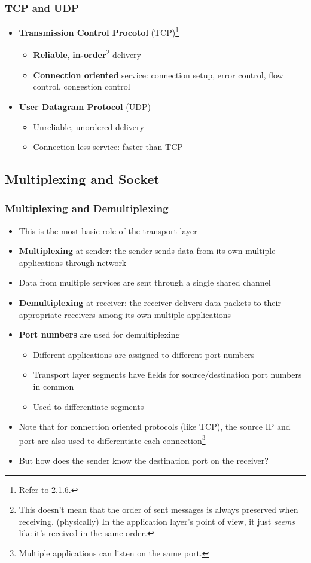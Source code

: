 \subsubsection{TCP and UDP}
\begin{itemize}
	\item \textbf{Transmission Control Procotol} (TCP)\footnote{Refer to 2.1.6.}
	\begin{itemize}
		\item \textbf{Reliable}, \textbf{in-order}\footnote{This doesn't mean that the order of sent messages is always preserved when receiving. (physically) In the application layer's point of view, it just \textit{seems} like it's received in the same order.} delivery
		\item \textbf{Connection oriented} service: connection setup, error control, flow control, congestion control
	\end{itemize}
	\item \textbf{User Datagram Protocol} (UDP)
	\begin{itemize}
		\item Unreliable, unordered delivery
		\item Connection-less service: faster than TCP
	\end{itemize}
\end{itemize}

\subsection{Multiplexing and Socket}
\subsubsection{Multiplexing and Demultiplexing}
\begin{itemize}
	\item This is the most basic role of the transport layer
	\item \textbf{Multiplexing} at sender: the sender sends data from its own multiple applications through network
	\item Data from multiple services are sent through a single shared channel
	\item \textbf{Demultiplexing} at receiver: the receiver delivers data packets to their appropriate receivers among its own multiple applications
	\item \textbf{Port numbers} are used for demultiplexing
	\begin{itemize}
		\item Different applications are assigned to different port numbers
		\item Transport layer segments have fields for source/destination port numbers in common
		\item Used to differentiate segments
	\end{itemize}
	\item Note that for connection oriented protocols (like TCP), the source IP and port are also used to differentiate each connection\footnote{Multiple applications can listen on the same port.}
	\item But how does the sender know the destination port on the receiver?
\end{itemize}

